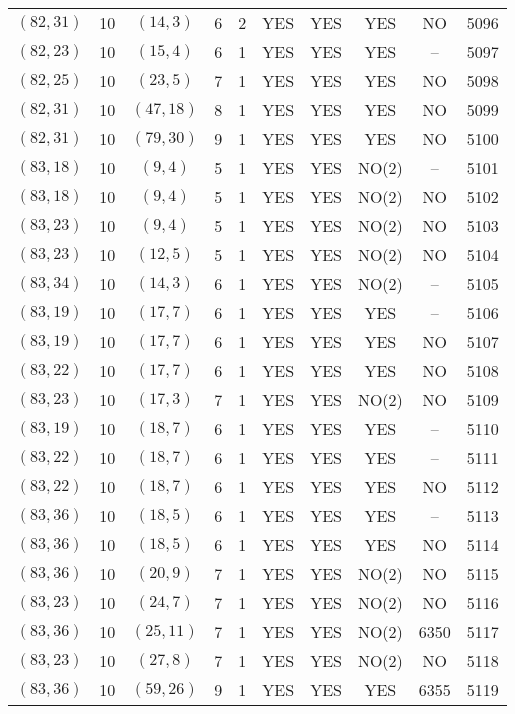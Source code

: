 \begin{longtable}{|c|c|c|c|c|c|c|c|c|c|}
$(82, 31)$ & 10 & $(14, 3)$ & 6 & 2 & YES & YES & YES & NO & 5096\\
$(82, 23)$ & 10 & $(15, 4)$ & 6 & 1 & YES & YES & YES & -- & 5097\\
$(82, 25)$ & 10 & $(23, 5)$ & 7 & 1 & YES & YES & YES & NO & 5098\\
$(82, 31)$ & 10 & $(47, 18)$ & 8 & 1 & YES & YES & YES & NO & 5099\\
$(82, 31)$ & 10 & $(79, 30)$ & 9 & 1 & YES & YES & YES & NO & 5100\\
$(83, 18)$ & 10 & $(9, 4)$ & 5 & 1 & YES & YES & NO(2) & -- & 5101\\
$(83, 18)$ & 10 & $(9, 4)$ & 5 & 1 & YES & YES & NO(2) & NO & 5102\\
$(83, 23)$ & 10 & $(9, 4)$ & 5 & 1 & YES & YES & NO(2) & NO & 5103\\
$(83, 23)$ & 10 & $(12, 5)$ & 5 & 1 & YES & YES & NO(2) & NO & 5104\\
$(83, 34)$ & 10 & $(14, 3)$ & 6 & 1 & YES & YES & NO(2) & -- & 5105\\
$(83, 19)$ & 10 & $(17, 7)$ & 6 & 1 & YES & YES & YES & -- & 5106\\
$(83, 19)$ & 10 & $(17, 7)$ & 6 & 1 & YES & YES & YES & NO & 5107\\
$(83, 22)$ & 10 & $(17, 7)$ & 6 & 1 & YES & YES & YES & NO & 5108\\
$(83, 23)$ & 10 & $(17, 3)$ & 7 & 1 & YES & YES & NO(2) & NO & 5109\\
$(83, 19)$ & 10 & $(18, 7)$ & 6 & 1 & YES & YES & YES & -- & 5110\\
$(83, 22)$ & 10 & $(18, 7)$ & 6 & 1 & YES & YES & YES & -- & 5111\\
$(83, 22)$ & 10 & $(18, 7)$ & 6 & 1 & YES & YES & YES & NO & 5112\\
$(83, 36)$ & 10 & $(18, 5)$ & 6 & 1 & YES & YES & YES & -- & 5113\\
$(83, 36)$ & 10 & $(18, 5)$ & 6 & 1 & YES & YES & YES & NO & 5114\\
$(83, 36)$ & 10 & $(20, 9)$ & 7 & 1 & YES & YES & NO(2) & NO & 5115\\
$(83, 23)$ & 10 & $(24, 7)$ & 7 & 1 & YES & YES & NO(2) & NO & 5116\\
$(83, 36)$ & 10 & $(25, 11)$ & 7 & 1 & YES & YES & NO(2) & 6350 & 5117\\
$(83, 23)$ & 10 & $(27, 8)$ & 7 & 1 & YES & YES & NO(2) & NO & 5118\\
$(83, 36)$ & 10 & $(59, 26)$ & 9 & 1 & YES & YES & YES & 6355 & 5119\\

\end{longtable}
